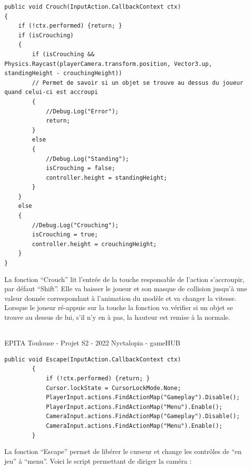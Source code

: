 \begin{lstlisting}[language={[Sharp]C}, caption={Fonction C\# Crouch}, label={ScriptCrouch}]
public void Crouch(InputAction.CallbackContext ctx)
{
    if (!ctx.performed) {return; }
	if (isCrouching)
	{
		if (isCrouching && Physics.Raycast(playerCamera.transform.position, Vector3.up, standingHeight - crouchingHeight))
		// Permet de savoir si un objet se trouve au dessus du joueur quand celui-ci est accroupi
		{
			//Debug.Log("Error");
			return;
		}
		else
		{
			//Debug.Log("Standing");
			isCrouching = false;
			controller.height = standingHeight;
		}
	}
	else
	{
		//Debug.Log("Crouching");
		isCrouching = true;
		controller.height = crouchingHeight;
	}
}
\end{lstlisting}
La fonction ``Crouch'' lit l'entrée de la touche responsable de l'action s'accroupir, par défaut ``Shift''. Elle va baisser le joueur et son masque de collision jusqu'à une valeur donnée correspondant à l'animation du modèle et va changer la vitesse. Lorsque le joueur ré-appuie sur la touche la fonction va vérifier si un objet se trouve au dessus de lui, s'il n'y en à pas, la hauteur est remise à la normale.

\vfill
\noindent\makebox[\linewidth]{\rule{.8\paperwidth}{.6pt}}\\[0.2cm]
EPITA Toulouse - Projet S2 - 2022 \hfill Nyctalopia - gameHUB
\noindent\makebox[\linewidth]{\rule{.8\paperwidth}{.6pt}}
\newpage

\begin{lstlisting}[language={[Sharp]C}, caption={Fonction C\# Escape}, label={ScriptEscape}]
public void Escape(InputAction.CallbackContext ctx)
		{
			if (!ctx.performed) {return; }
			Cursor.lockState = CursorLockMode.None;
			PlayerInput.actions.FindActionMap("Gameplay").Disable();
			PlayerInput.actions.FindActionMap("Menu").Enable();
			CameraInput.actions.FindActionMap("Gameplay").Disable();
			CameraInput.actions.FindActionMap("Menu").Enable();
		}
\end{lstlisting}
La fonction ``Escape'' permet de libérer le curseur et change les contrôles de ``en jeu'' à ``menu''.
Voici le script permettant de diriger la caméra :
\newline

